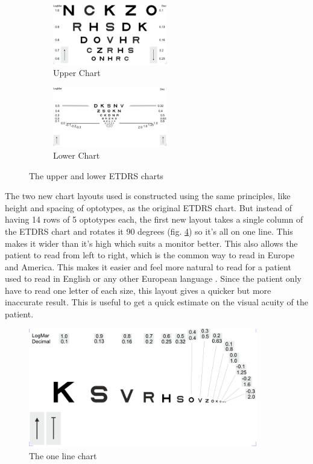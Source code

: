 \documentclass[12pt,a4paper,notitlepage]{report}
\begin{document}
\begin{figure}[ht!]
\centering
\begin{subfigure}{.5\textwidth}
  \centering
  \includegraphics[width=50mm]{images/etdrs_top.png}
  \caption{Upper Chart}
  \label{fig:etdrs_upper}
\end{subfigure}%
\begin{subfigure}{.5\textwidth}
  \centering
  \includegraphics[width=50mm]{images/etdrs_bottom.png}
  \caption{Lower Chart}
  \label{fig:etdrs_lower}
\end{subfigure}
\caption{The upper and lower ETDRS charts}
\label{fig:etdrs_upper_lower}
\end{figure}

The two new chart layouts used is constructed using the same principles, like height and spacing of optotypes, as the original ETDRS chart. But instead of having 14 rows of 5 optotypes each, the first new layout takes a single column of the ETDRS chart and rotates it 90 degrees (fig. \ref{fig:etdrs_one_line}) so it's all on one line. This makes it wider than it's high which suits a monitor better. This also allows the patient to read from left to right, which is the common way to read in Europe and America. This makes it easier and feel more natural to read for a patient used to read in English or any other European language \cite{PGSoderbergOral}. Since the patient only have to read one letter of each size, this layout gives a quicker but more inaccurate result. This is useful to get a quick estimate on the visual acuity of the patient.

\begin{figure}[ht!]
\centering
\includegraphics[width=100mm]{images/etdrs_one_line.png}
\caption{The one line chart}
\label{fig:etdrs_one_line}
\end{figure}
\end{document}
